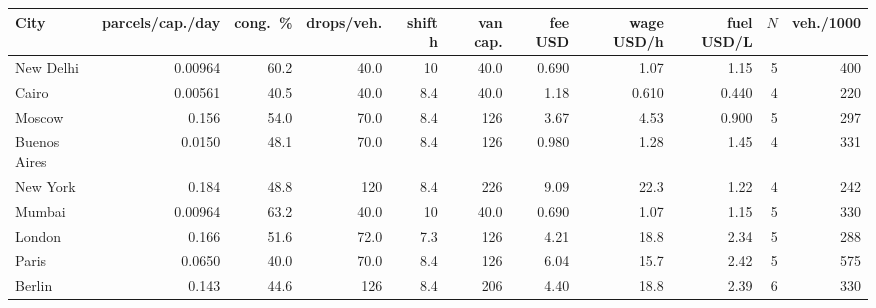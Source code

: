 \begin{tabular}{lrrrrrrrrrr}
\toprule
City & parcels/cap./day & cong.\ \% & drops/veh. & shift h & van cap. & fee USD & wage USD/h & fuel USD/L & $N$ & veh./1000 \\
\midrule
New Delhi & 0.00964 & 60.2 & 40.0 & 10 & 40.0 & 0.690 & 1.07 & 1.15 & 5 & 400 \\
Cairo & 0.00561 & 40.5 & 40.0 & 8.4 & 40.0 & 1.18 & 0.610 & 0.440 & 4 & 220 \\
Moscow & 0.156 & 54.0 & 70.0 & 8.4 & 126 & 3.67 & 4.53 & 0.900 & 5 & 297 \\
Buenos Aires & 0.0150 & 48.1 & 70.0 & 8.4 & 126 & 0.980 & 1.28 & 1.45 & 4 & 331 \\
New York & 0.184 & 48.8 & 120 & 8.4 & 226 & 9.09 & 22.3 & 1.22 & 4 & 242 \\
Mumbai & 0.00964 & 63.2 & 40.0 & 10 & 40.0 & 0.690 & 1.07 & 1.15 & 5 & 330 \\
London & 0.166 & 51.6 & 72.0 & 7.3 & 126 & 4.21 & 18.8 & 2.34 & 5 & 288 \\
Paris & 0.0650 & 40.0 & 70.0 & 8.4 & 126 & 6.04 & 15.7 & 2.42 & 5 & 575 \\
Berlin & 0.143 & 44.6 & 126 & 8.4 & 206 & 4.40 & 18.8 & 2.39 & 6 & 330 \\
\bottomrule
\end{tabular}
